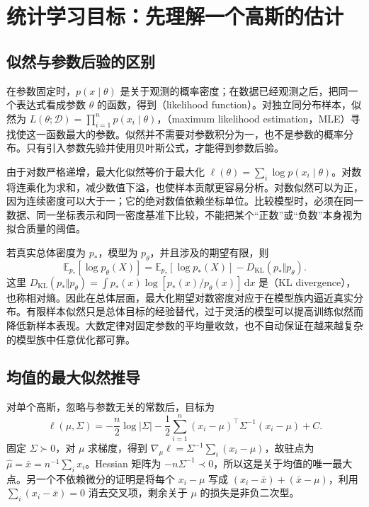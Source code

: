\documentclass[UTF8]{ctexart}
\begin{document}
\section{统计学习目标：先理解一个高斯的估计}
\label{sec:gmm-single-estimation}

\subsection{似然与参数后验的区别}
在参数固定时，$p(x\mid\theta)$ 是关于观测的概率密度；在数据已经观测之后，把同一个表达式看成参数 $\theta$ 的函数，得到（likelihood function）。对独立同分布样本，似然为 $L(\theta;\mathcal D)=\prod_{i=1}^np(x_i\mid\theta)$，（maximum likelihood estimation，MLE）寻找使这一函数最大的参数。似然并不需要对参数积分为一，也不是参数的概率分布。只有引入参数先验并使用贝叶斯公式，才能得到参数后验。

由于对数严格递增，最大化似然等价于最大化 $\ell(\theta)=\sum_i\log p(x_i\mid\theta)$。对数将连乘化为求和，减少数值下溢，也使样本贡献更容易分析。对数似然可以为正，因为连续密度可以大于一；它的绝对数值依赖坐标单位。比较模型时，必须在同一数据、同一坐标表示和同一密度基准下比较，不能把某个“正数”或“负数”本身视为拟合质量的阈值。

若真实总体密度为 $p_*$，模型为 $p_\theta$，并且涉及的期望有限，则
\[
\mathbb E_{p_*}[\log p_\theta(X)]
=\mathbb E_{p_*}[\log p_*(X)]-D_{\mathrm{KL}}(p_*\Vert p_\theta).
\]
这里 $D_{\mathrm{KL}}(p_*\Vert p_\theta)=\int p_*(x)\log[p_*(x)/p_\theta(x)]\,\mathrm dx$ 是（KL divergence），也称相对熵。因此在总体层面，最大化期望对数密度对应于在模型族内逼近真实分布。有限样本似然只是总体目标的经验替代，过于灵活的模型可以提高训练似然而降低新样本表现。大数定律对固定参数的平均量收敛，也不自动保证在越来越复杂的模型族中任意优化都可靠。

\subsection{均值的最大似然推导}
对单个高斯，忽略与参数无关的常数后，目标为
\[
\ell(\mu,\Sigma)=-\frac n2\log|\Sigma|
-\frac12\sum_{i=1}^n(x_i-\mu)^\top\Sigma^{-1}(x_i-\mu)+C.
\]
固定 $\Sigma\succ0$，对 $\mu$ 求梯度，得到 $\nabla_\mu\ell=\Sigma^{-1}\sum_i(x_i-\mu)$，故驻点为 $\widehat\mu=\bar x=n^{-1}\sum_i x_i$。Hessian 矩阵为 $-n\Sigma^{-1}\prec0$，所以这是关于均值的唯一最大点。另一个不依赖微分的证明是将每个 $x_i-\mu$ 写成 $(x_i-\bar x)+(\bar x-\mu)$，利用 $\sum_i(x_i-\bar x)=0$ 消去交叉项，剩余关于 $\mu$ 的损失是非负二次型。
\end{document}
